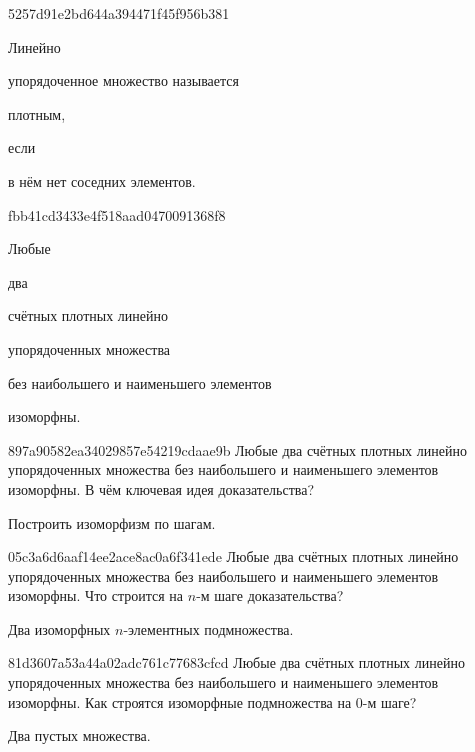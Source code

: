 \begin{note}{5257d91e2bd644a394471f45f956b381}
    \begin{icloze}{3}Линейно\end{icloze} упорядоченное множество называется \begin{icloze}{2}плотным,\end{icloze} если \begin{icloze}{1}в нём нет соседних элементов.\end{icloze}
\end{note}

\begin{note}{fbb41cd3433e4f518aad0470091368f8}
    \begin{icloze}{4}Любые\end{icloze} два \begin{icloze}{3}счётных плотных линейно\end{icloze} упорядоченных множества \begin{icloze}{2}без наибольшего и наименьшего элементов\end{icloze} \begin{icloze}{1}изоморфны.\end{icloze}
\end{note}

\begin{note}{897a90582ea34029857e54219cdaae9b}
    Любые два счётных плотных линейно упорядоченных множества без наибольшего и наименьшего элементов изоморфны.
    В чём ключевая идея доказательства?

    \begin{cloze}{1}
        Построить изоморфизм по шагам.
    \end{cloze}
\end{note}

\begin{note}{05c3a6d6aaf14ee2ace8ac0a6f341ede}
    Любые два счётных плотных линейно упорядоченных множества без наибольшего и наименьшего элементов изоморфны.
    Что строится на \({ n }\)-м шаге доказательства?

    \begin{cloze}{1}
        Два изоморфных \({ n }\)-элементных подмножества.
    \end{cloze}
\end{note}

\begin{note}{81d3607a53a44a02adc761c77683cfcd}
    Любые два счётных плотных линейно упорядоченных множества без наибольшего и наименьшего элементов изоморфны.
    Как строятся изоморфные подмножества на \({ 0 }\)-м шаге?

    \begin{cloze}{1}
        Два пустых множества.
    \end{cloze}
\end{note}

